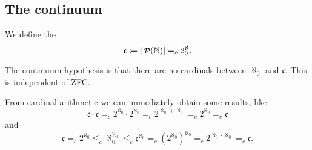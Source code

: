 \subsection{The continuum}
\begin{definition}
We define the 
\[ \mathfrak{c} \coloneqq |\mathop{\mathcal{P}}(\mathbb{N})| =_c 2^\aleph_0. \]
\end{definition}
The continuum hypothesis is that there are no cardinals between $\aleph_0$ and $\mathfrak{c}$. This is independent of ZFC.

From cardinal arithmetic we can immediately obtain some results, like
\[ \mathfrak{c}\cdot\mathfrak{c} =_c 2^{\aleph_0}\cdot 2^{\aleph_0} =_c 2^{\aleph_0+\aleph_0} =_c 2^{\aleph_0} =_c \mathfrak{c}\]
and
\[ \mathfrak{c} =_c 2^{\aleph_0} \leq_c \aleph_0^{\aleph_0} \leq_c \mathfrak{c}^{\aleph_0} =_c \left(2^{\aleph_0}\right)^{\aleph_0} =_c 2^{\aleph_0\cdot \aleph_0} =_c \mathfrak{c}.\]
